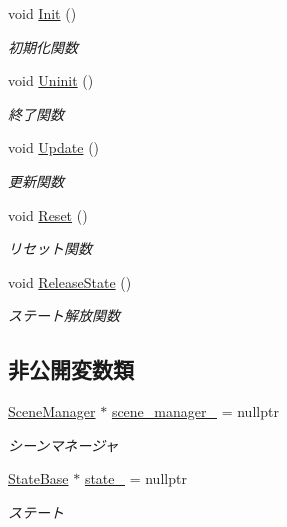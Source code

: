 \begin{DoxyCompactItemize}
void \mbox{\hyperlink{class_scene_base_a494ba624fdd95b296e4487ed1a34f47b}{Init}} ()
\begin{DoxyCompactList}\small\item\em 初期化関数 \end{DoxyCompactList}\item 
void \mbox{\hyperlink{class_scene_base_aa4babf42cf2c2b6e17bb3ddd6ff13d31}{Uninit}} ()
\begin{DoxyCompactList}\small\item\em 終了関数 \end{DoxyCompactList}\item 
void \mbox{\hyperlink{class_scene_base_a71f332a32d99548b3aa912210a2dd0b0}{Update}} ()
\begin{DoxyCompactList}\small\item\em 更新関数 \end{DoxyCompactList}\item 
void \mbox{\hyperlink{class_scene_base_ae2dc09554ec21ffe231fa73a6cdd7ca1}{Reset}} ()
\begin{DoxyCompactList}\small\item\em リセット関数 \end{DoxyCompactList}\item 
void \mbox{\hyperlink{class_scene_base_aaa1e66fbfc6740b069d715b325915b97}{Release\+State}} ()
\begin{DoxyCompactList}\small\item\em ステート解放関数 \end{DoxyCompactList}\end{DoxyCompactItemize}
\subsection*{非公開変数類}
\begin{DoxyCompactItemize}
\item 
\mbox{\hyperlink{class_scene_manager}{Scene\+Manager}} $\ast$ \mbox{\hyperlink{class_scene_base_af9f693449ce2472d28f692bd64d5c2ef}{scene\+\_\+manager\+\_\+}} = nullptr
\begin{DoxyCompactList}\small\item\em シーンマネージャ \end{DoxyCompactList}\item 
\mbox{\hyperlink{class_scene_base_1_1_state_base}{State\+Base}} $\ast$ \mbox{\hyperlink{class_scene_base_a9d8b7237f492e9ce0724714393b0e881}{state\+\_\+}} = nullptr
\begin{DoxyCompactList}\small\item\em ステート \end{DoxyCompactList}\end{DoxyCompactItemize}


